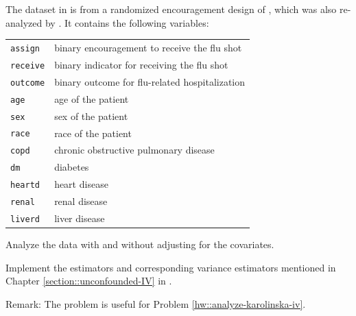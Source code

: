 \begin{HomeworkProblem}
\end{HomeworkProblem}

\begin{HomeworkProblem}\label{exr:21-7}


The dataset in  is from a randomized encouragement design of \citet{mcdonald1992effects}, which was also re-analyzed by \citet{hirano2000assessing}. It contains the following variables:

\begin{tabular}{ll}
\hline
\texttt{assign} & binary encouragement to receive the flu shot\\
\texttt{receive} & binary indicator for receiving the flu shot \\
\texttt{outcome} & binary outcome for flu-related hospitalization\\
\texttt{age} & age of the patient\\
\texttt{sex} & sex of the patient\\
\texttt{race} & race of the patient\\
\texttt{copd} &  chronic obstructive pulmonary disease\\
\texttt{dm} & diabetes\\
\texttt{heartd} & heart  disease\\
\texttt{renal} & renal  disease\\
\texttt{liverd} & liver  disease\\
\hline
\end{tabular}


Analyze the data with and without adjusting for the covariates.



\end{HomeworkProblem}

\begin{HomeworkProblem}\label{exr:21-8}

Implement the estimators and corresponding variance estimators mentioned in Chapter \ref{section::unconfounded-IV} in .

Remark: The problem is useful for Problem \ref{hw::analyze-karolinska-iv}.



\end{HomeworkProblem}


